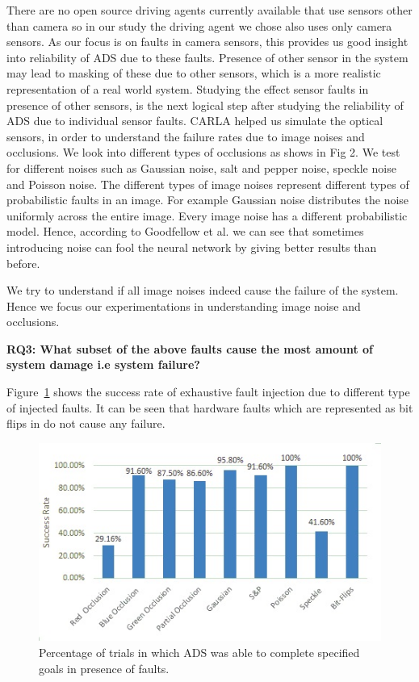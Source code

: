 There are no open source driving agents currently available that use sensors other than camera so in our study the driving agent we chose also uses only camera sensors. As our focus is on faults in camera sensors, this provides us good insight into reliability of ADS due to these faults. Presence of other sensor in the system may lead to masking of these due to other sensors, which is a more realistic representation of a real world system. Studying the effect sensor faults in presence of other sensors, is the next logical step after studying the reliability of ADS due to individual sensor faults.  
CARLA helped us simulate the optical sensors, in order to understand the failure rates due to image noises and occlusions. We look into different types of occlusions as shows in Fig 2. We test for different noises such as Gaussian noise, salt and pepper noise, speckle noise and Poisson noise. The different types of image noises represent different types of probabilistic faults in an image. For example Gaussian noise distributes the noise uniformly across the entire image. Every image noise has a different probabilistic model. Hence, according to Goodfellow et al. \cite{2014arXiv1412.6572G} we can see that sometimes introducing noise can fool the neural network by giving better results than before. 

We try to understand if all image noises indeed cause the failure of the system. Hence we focus our experimentations in understanding image noise and occlusions.

\textbf{RQ3: What subset of the above faults cause the most amount of system damage i.e system failure?}

Figure~\ref{fig:success_rate} shows the success rate of exhaustive fault injection due to different type of injected faults. It can be seen that hardware faults which are represented as bit flips in do not cause any failure.

\begin{figure}
	\vspace{-0.5em}
	\centering
	\includegraphics[scale=0.7]{success_rate}
	\vspace{-0.5em}
	\caption{Percentage of trials in which ADS was able to complete specified goals in presence of faults.}
	\label{fig:success_rate}
	\vspace{-1.5em}
\end{figure}

